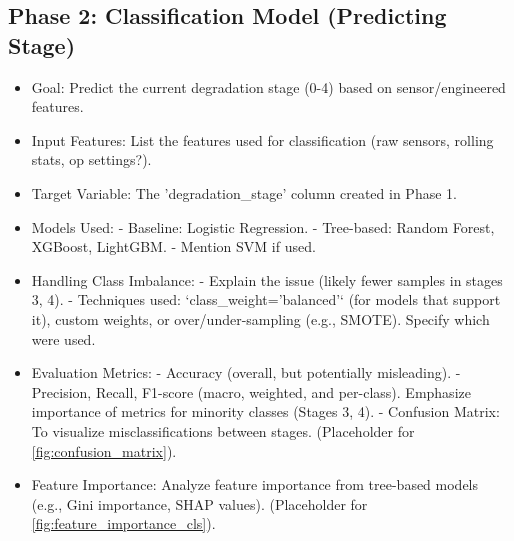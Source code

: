 
\subsection{Phase 2: Classification Model (Predicting Stage)}
\label{subsec:classification}
\begin{itemize}
    \item Goal: Predict the current degradation stage (0-4) based on sensor/engineered features.
    \item Input Features: List the features used for classification (raw sensors, rolling stats, op settings?).
    \item Target Variable: The 'degradation\_stage' column created in Phase 1.
    \item Models Used:
        - Baseline: Logistic Regression.
        - Tree-based: Random Forest, XGBoost, LightGBM.
        - Mention SVM if used.
    \item Handling Class Imbalance:
        - Explain the issue (likely fewer samples in stages 3, 4).
        - Techniques used: `class_weight='balanced'` (for models that support it), custom weights, or over/under-sampling (e.g., SMOTE). Specify which were used.
    \item Evaluation Metrics:
        - Accuracy (overall, but potentially misleading).
        - Precision, Recall, F1-score (macro, weighted, and per-class). Emphasize importance of metrics for minority classes (Stages 3, 4).
        - Confusion Matrix: To visualize misclassifications between stages. (Placeholder for \cref{fig:confusion_matrix}).
    \item Feature Importance: Analyze feature importance from tree-based models (e.g., Gini importance, SHAP values). (Placeholder for \cref{fig:feature_importance_cls}).
\end{itemize}


